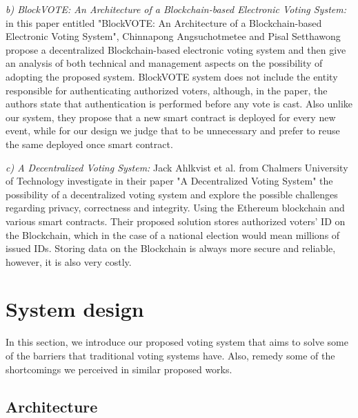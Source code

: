 \textit{b) BlockVOTE: An Architecture of a Blockchain-based Electronic Voting System:} in this paper entitled "BlockVOTE: An Architecture of a Blockchain-based Electronic Voting System"\cite{angsuchotmeteeBlockVOTEArchitectureBlockchainbased2019}, Chinnapong Angsuchotmetee and Pisal Setthawong propose a decentralized Blockchain-based electronic voting system and then give an analysis of both technical and management aspects on the possibility of adopting the proposed system. BlockVOTE system does not include the entity responsible for authenticating authorized voters, although, in the paper, the authors state that authentication is performed before any vote is cast. Also unlike our system, they propose that a new smart contract is deployed for every new event, while for our design we judge that to be unnecessary and prefer to reuse the same deployed once smart contract.
 
\textit{c) A Decentralized Voting System:} Jack Ahlkvist
et al. from Chalmers University of Technology investigate in their paper "A Decentralized Voting System"\cite{ahlkvistDecentralizedVotingSystem2019} the possibility of a decentralized voting system and explore the possible challenges regarding privacy, correctness and integrity. Using the Ethereum blockchain and various smart contracts. Their proposed solution stores authorized voters' ID on the Blockchain, which in the case of a national election would mean millions of issued IDs. Storing data on the Blockchain is always more secure and reliable, however, it is also very costly.

\section{System design}

In this section, we introduce our proposed voting system that aims to solve some of the barriers that traditional voting systems have. Also, remedy some of the shortcomings we perceived in similar proposed works.

\subsection{Architecture}

